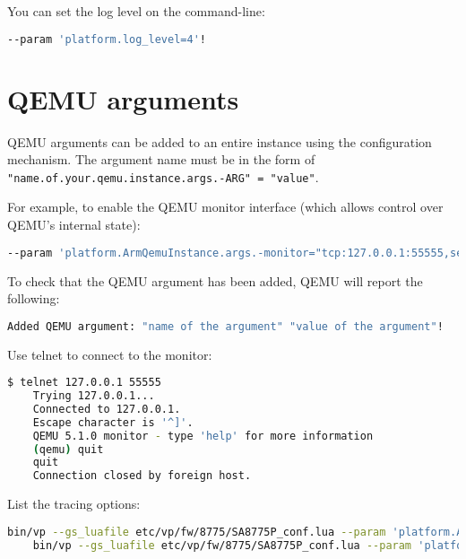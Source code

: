 You can set the log level on the command-line:
\small
\begin{lstlisting}[language=bash]
    --param 'platform.log_level=4'!
\end{lstlisting}
\normalsize



\section{QEMU arguments}
\label{sec:qemuArguments}

QEMU arguments can be added to an entire instance using the configuration mechanism. The argument name must be in the form of {\small{\lstinline!"name.of.your.qemu.instance.args.-ARG" = "value"!}}.

For example, to enable the QEMU monitor interface (which allows control over QEMU's internal state):

\small
\begin{lstlisting}[language=bash]
    --param 'platform.ArmQemuInstance.args.-monitor="tcp:127.0.0.1:55555,server,nowait"'!
\end{lstlisting}
\normalsize

To check that the QEMU argument has been added, QEMU will report the following:

\small
\begin{lstlisting}[language=bash]
    Added QEMU argument: "name of the argument" "value of the argument"!
\end{lstlisting}
\normalsize

Use telnet to connect to the monitor:

\small
\begin{lstlisting}[language=bash]
    $ telnet 127.0.0.1 55555
    Trying 127.0.0.1...
    Connected to 127.0.0.1.
    Escape character is '^]'.
    QEMU 5.1.0 monitor - type 'help' for more information
    (qemu) quit
    quit
    Connection closed by foreign host.
\end{lstlisting}
\normalsize

List the tracing options:

\small
\begin{lstlisting}[language=bash]
    bin/vp --gs_luafile etc/vp/fw/8775/SA8775P_conf.lua --param 'platform.ArmQemuInstance.args.-d="help"'
    bin/vp --gs_luafile etc/vp/fw/8775/SA8775P_conf.lua --param 'platform.hexagon_cluster_0.HexagonQemuInstance.args.-d="help"'
\end{lstlisting}
\normalsize

